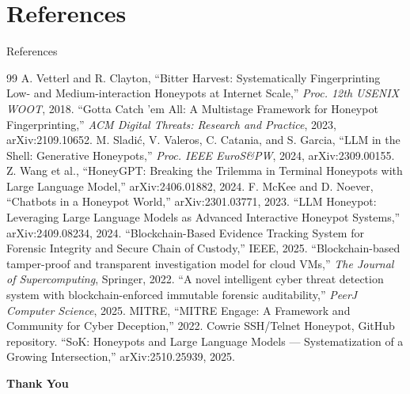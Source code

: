 \documentclass[aspectratio=169, 11pt]{beamer}
\begin{document}
\section{References}
\begin{frame}[allowframebreaks]{References}
    \scriptsize
    \begin{thebibliography}{99}
         A. Vetterl and R. Clayton, ``Bitter Harvest: Systematically Fingerprinting Low- and Medium-interaction Honeypots at Internet Scale,'' \textit{Proc. 12th USENIX WOOT}, 2018.
         ``Gotta Catch 'em All: A Multistage Framework for Honeypot Fingerprinting,'' \textit{ACM Digital Threats: Research and Practice}, 2023, arXiv:2109.10652.
         M. Sladi\'{c}, V. Valeros, C. Catania, and S. Garcia, ``LLM in the Shell: Generative Honeypots,'' \textit{Proc. IEEE EuroS\&PW}, 2024, arXiv:2309.00155.
         Z. Wang et al., ``HoneyGPT: Breaking the Trilemma in Terminal Honeypots with Large Language Model,'' arXiv:2406.01882, 2024.
         F. McKee and D. Noever, ``Chatbots in a Honeypot World,'' arXiv:2301.03771, 2023.
         ``LLM Honeypot: Leveraging Large Language Models as Advanced Interactive Honeypot Systems,'' arXiv:2409.08234, 2024.
         ``Blockchain-Based Evidence Tracking System for Forensic Integrity and Secure Chain of Custody,'' IEEE, 2025.
         ``Blockchain-based tamper-proof and transparent investigation model for cloud VMs,'' \textit{The Journal of Supercomputing}, Springer, 2022.
         ``A novel intelligent cyber threat detection system with blockchain-enforced immutable forensic auditability,'' \textit{PeerJ Computer Science}, 2025.
         MITRE, ``MITRE Engage: A Framework and Community for Cyber Deception,'' 2022.
         Cowrie SSH/Telnet Honeypot, GitHub repository.
         ``SoK: Honeypots and Large Language Models --- Systematization of a Growing Intersection,'' arXiv:2510.25939, 2025.
    \end{thebibliography}
\end{frame}

\begin{frame}
    \centering
    {\Huge \textbf{\textcolor{amritaMaroon}{Thank You}}}
\end{frame}
\end{document}
